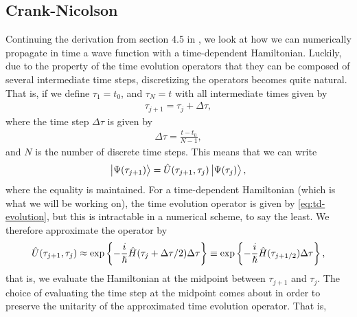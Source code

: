         \subsection{Crank-Nicolson}
            Continuing the derivation from section 4.5 in
            \citeauthor{ullrich2011time} \cite{ullrich2011time}, we look at how we
            can numerically propagate in time a wave function with a time-dependent
            Hamiltonian.
            Luckily, due to the property of the time evolution operators that they
            can be composed of several intermediate time steps, discretizing the
            operators becomes quite natural.
            That is, if we define $\tau_1 = t_0$, and $\tau_N = t$ with all
            intermediate times given by
            \begin{align}
                \tau_{j + 1} = \tau_j + \Delta \tau,
            \end{align}
            where the time step $\Delta \tau$ is given by
            \begin{align}
                \Delta \tau = \frac{t - t_0}{N - 1},
            \end{align}
            and $N$ is the number of discrete time steps. This means that we can
            write
            \begin{align}
                \ket{\Psi(\tau_{j + 1})}
                = \hat{U}(\tau_{j + 1}, \tau_{j})\ket{\Psi(\tau_j)},
            \end{align}
            where the equality is maintained. For a time-dependent Hamiltonian
            (which is what we will be working on), the time evolution operator is
            given by \autoref{eq:td-evolution}, but this is intractable in a
            numerical scheme, to say the least. We therefore approximate the
            operator by
            \begin{align}
                \hat{U}(\tau_{j + 1}, \tau_{j})
                \approx \exp\left\{ 
                    -\frac{i}{\hslash}\hat{H}(\tau_{j} + \Delta\tau/2)\Delta\tau
                 \right\}
                \equiv
                \exp\left\{ 
                    -\frac{i}{\hslash}\hat{H}(\tau_{j + 1/2})\Delta\tau
                 \right\},
            \end{align}
            that is, we evaluate the Hamiltonian at the midpoint between $\tau_{j +
            1}$ and $\tau_{j}$. The choice of evaluating the time step at the
            midpoint comes about in order to preserve the unitarity of the
            approximated time evolution operator. That is,
